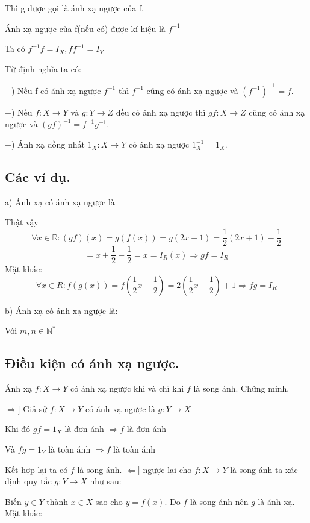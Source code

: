 \documentclass[12pt,oneside,a4paper,reqno]{book}
\begin{document}
Thì g được gọi là ánh xạ ngược của f.

Ánh xạ ngược của f(nếu có) được kí hiệu là $f^{-1}$

Ta có $f^{-1} f=I_X,ff^{-1}=I_Y$

Từ định nghĩa ta có:

 +) Nếu f có ánh xạ ngược $f^{-1}$ thì $f^{-1}$ cũng có ánh xạ ngược  và $(f^{-1} )^{-1}=f.$
 
 +) Nếu $f:X\to Y$ và $g:Y\to Z$ đều có ánh xạ ngược thì $gf:X\to Z$ cũng có ánh xạ ngược và $(gf)^{-1}=f^{-1} g^{-1}$.

 +) Ánh xạ đồng nhất $1_X:X\to Y$ có ánh xạ ngược $1_X^{-1}=1_X.$

\subsection{Các ví dụ.}
a)	Ánh xạ  có ánh xạ ngược là



Thật vậy $$\forall x\in \mathbb{R}:(gf)(x)=g(f(x))=g(2x+1)=\frac{1}{2} (2x+1)-\frac{1}{2}$$
 $$=x+\frac{1}{2}-\frac{1}{2}=x=I_R (x)\Rightarrow gf=I_R$$
Mặt khác:
$$\forall x\in R:f(g(x))=f(\frac{1}{2} x-\frac{1}{2})=2(\frac{1}{2} x-\frac{1}{2})+1\Rightarrow fg=I_R$$

b)	Ánh xạ  có ánh xạ ngược là:
   

Với $m,n \in \mathbb{N}^*$

\subsection{Điều kiện có ánh xạ ngược.}
Ánh xạ $f:X\to Y$ có ánh xạ ngược khi và chỉ khi $f$ là song ánh.
Chứng minh.

$\Rightarrow ]$ Giả sử $f:X\to Y$ có ánh xạ ngược là $g:Y\to X$

Khi đó $gf=1_X$  là đơn ánh $\Rightarrow f$ là đơn ánh

Và  $fg=1_Y$ là toàn ánh $\Rightarrow f$ là toàn ánh

Kết hợp lại ta có $f$ là song ánh.
$\Leftarrow ]$ ngược lại cho $f:X\to Y$ là song ánh ta xác định quy tắc $g:Y\to X$ như sau:

Biến $y\in Y$ thành $x\in X$ sao cho $y=f(x)$. Do $f$ là song ánh nên $g$ là ánh xạ.
Mặt khác:
\end{document}
